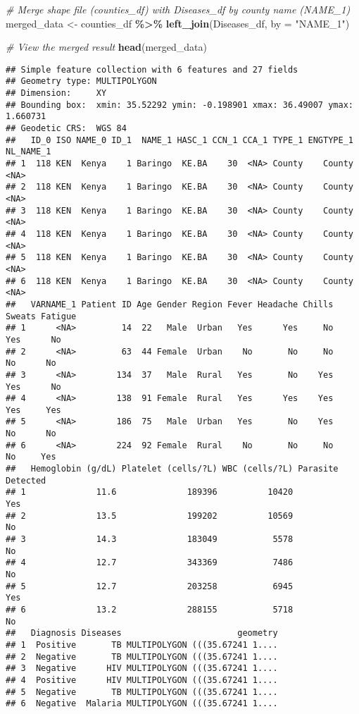 \documentclass[
]{article}
\newenvironment{Shaded}{\begin{snugshade}}{\end{snugshade}}
\newcommand{\AttributeTok}[1]{\textcolor[rgb]{0.13,0.29,0.53}{#1}}
\newcommand{\CommentTok}[1]{\textcolor[rgb]{0.56,0.35,0.01}{\textit{#1}}}
\newcommand{\FunctionTok}[1]{\textcolor[rgb]{0.13,0.29,0.53}{\textbf{#1}}}
\newcommand{\NormalTok}[1]{#1}
\newcommand{\OtherTok}[1]{\textcolor[rgb]{0.56,0.35,0.01}{#1}}
\newcommand{\SpecialCharTok}[1]{\textcolor[rgb]{0.81,0.36,0.00}{\textbf{#1}}}
\newcommand{\StringTok}[1]{\textcolor[rgb]{0.31,0.60,0.02}{#1}}
\begin{document}
\begin{Shaded}
\begin{Highlighting}[]
\CommentTok{\# Merge shape file (counties\_df) with Diseases\_df by county name (NAME\_1)}
\NormalTok{merged\_data }\OtherTok{\textless{}{-}}\NormalTok{ counties\_df }\SpecialCharTok{\%\textgreater{}\%}
  \FunctionTok{left\_join}\NormalTok{(Diseases\_df, }\AttributeTok{by =} \StringTok{"NAME\_1"}\NormalTok{)}

\CommentTok{\# View the merged result}
\FunctionTok{head}\NormalTok{(merged\_data)}
\end{Highlighting}
\end{Shaded}

\begin{verbatim}
## Simple feature collection with 6 features and 27 fields
## Geometry type: MULTIPOLYGON
## Dimension:     XY
## Bounding box:  xmin: 35.52292 ymin: -0.198901 xmax: 36.49007 ymax: 1.660731
## Geodetic CRS:  WGS 84
##   ID_0 ISO NAME_0 ID_1  NAME_1 HASC_1 CCN_1 CCA_1 TYPE_1 ENGTYPE_1 NL_NAME_1
## 1  118 KEN  Kenya    1 Baringo  KE.BA    30  <NA> County    County      <NA>
## 2  118 KEN  Kenya    1 Baringo  KE.BA    30  <NA> County    County      <NA>
## 3  118 KEN  Kenya    1 Baringo  KE.BA    30  <NA> County    County      <NA>
## 4  118 KEN  Kenya    1 Baringo  KE.BA    30  <NA> County    County      <NA>
## 5  118 KEN  Kenya    1 Baringo  KE.BA    30  <NA> County    County      <NA>
## 6  118 KEN  Kenya    1 Baringo  KE.BA    30  <NA> County    County      <NA>
##   VARNAME_1 Patient ID Age Gender Region Fever Headache Chills Sweats Fatigue
## 1      <NA>         14  22   Male  Urban   Yes      Yes     No    Yes      No
## 2      <NA>         63  44 Female  Urban    No       No     No     No      No
## 3      <NA>        134  37   Male  Rural   Yes       No    Yes    Yes      No
## 4      <NA>        138  91 Female  Rural   Yes      Yes    Yes    Yes     Yes
## 5      <NA>        186  75   Male  Urban   Yes       No    Yes     No      No
## 6      <NA>        224  92 Female  Rural    No       No     No     No     Yes
##   Hemoglobin (g/dL) Platelet (cells/?L) WBC (cells/?L) Parasite Detected
## 1              11.6              189396          10420               Yes
## 2              13.5              199202          10569                No
## 3              14.3              183049           5578                No
## 4              12.7              343369           7486                No
## 5              12.7              203258           6945               Yes
## 6              13.2              288155           5718                No
##   Diagnosis Diseases                       geometry
## 1  Positive       TB MULTIPOLYGON (((35.67241 1....
## 2  Negative       TB MULTIPOLYGON (((35.67241 1....
## 3  Negative      HIV MULTIPOLYGON (((35.67241 1....
## 4  Positive      HIV MULTIPOLYGON (((35.67241 1....
## 5  Negative       TB MULTIPOLYGON (((35.67241 1....
## 6  Negative  Malaria MULTIPOLYGON (((35.67241 1....
\end{verbatim}
\end{document}
